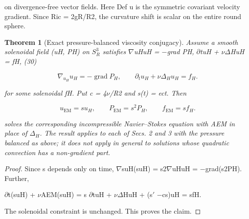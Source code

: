 \documentclass[10pt,letterpaper]{article}
\newtheorem{theorem}{Theorem}[section]
\theoremstyle{remark}
\begin{document}
on divergence-free vector fields. Here Def u is the symmetric covariant velocity gradient. Since Ric = 2gR/R2, the curvature shift is scalar on the entire round sphere.


\begin{theorem}[Exact pressure-balanced viscosity conjugacy]

Assume a smooth solenoidal field (uH, PH) on \(S_R^3\) satisfies \(\nabla \)uHuH = \(- \)grad PH, \(\partial \)tuH + \(\nu \Delta \)HuH = fH, (30)


\begin{equation}
\tag{30}\label{eq:30}
\nabla_{u_H}u_H=-\operatorname{grad}P_H,\qquad\partial_tu_H+\nu\Delta_Hu_H=f_H.
\end{equation}

for some solenoidal fH. Put c = 4\(\nu \)/R2 and s(t) = ect. Then



\begin{equation}
\tag{31}\label{eq:31}
u_{\mathrm{EM}}=su_H,\qquad P_{\mathrm{EM}}=s^2P_H,\qquad f_{\mathrm{EM}}=sf_H.
\end{equation}

solves the corresponding incompressible Navier–Stokes equation with AEM in place of \(\Delta_H\). The result applies to each of Secs. 2 and 3 with the pressure balanced as above; it does not apply in general to solutions whose quadratic convection has a non-gradient part.


\end{theorem}

\begin{proof}
Since s depends only on time, \(\nabla \)suH(suH) = s2\(\nabla \)uHuH = \(- \)grad(s2PH). Further,

\(\partial \)t(suH) + \(\nu \)AEM(suH) = s \(\partial \)tuH + \(\nu \Delta \)HuH  + (s\(\prime\) \(- \)cs)uH = sfH.


The solenoidal constraint is unchanged. This proves the claim.


\end{proof}
\end{document}
